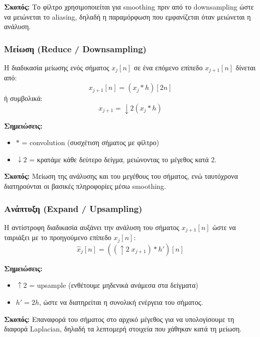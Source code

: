 \documentclass[12pt]{article}
\begin{document}
\textbf{Σκοπός:} Το φίλτρο χρησιμοποιείται για smoothing πριν από το downsampling ώστε να μειώνεται το aliasing, δηλαδή η παραμόρφωση που εμφανίζεται όταν μειώνεται η ανάλυση.

\subsubsection{Μείωση (Reduce / Downsampling)}

Η διαδικασία μείωσης ενός σήματος $x_j[n]$ σε ένα επόμενο επίπεδο $x_{j+1}[n]$ δίνεται από:
\begin{equation}
x_{j+1}[n] = (x_j * h)[2n]
\label{eq:reduce1}
\end{equation}
ή συμβολικά:
\begin{equation}
x_{j+1} = \downarrow 2 (x_j * h)
\label{eq:reduce2}
\end{equation}

\textbf{Σημειώσεις:}
\begin{itemize}
    \item $*$ = convolution (συσχέτιση σήματος με φίλτρο)
    \item $\downarrow 2$ = κρατάμε κάθε δεύτερο δείγμα, μειώνοντας το μέγεθος κατά 2.
\end{itemize}

\textbf{Σκοπός:} Μείωση της ανάλυσης και του μεγέθους του σήματος, ενώ ταυτόχρονα διατηρούνται οι βασικές πληροφορίες μέσω smoothing.

\subsubsection{Ανάπτυξη (Expand / Upsampling)}

Η αντίστροφη διαδικασία αυξάνει την ανάλυση του σήματος $x_{j+1}[n]$ ώστε να ταιριάξει με το προηγούμενο επίπεδο $x_j[n]$:
\begin{equation}
\hat{x}_j[n] = ((\uparrow 2 \; x_{j+1}) * h')[n]
\label{eq:expand}
\end{equation}

\textbf{Σημειώσεις:}
\begin{itemize}
    \item $\uparrow 2$ = upsample (ενθέτουμε μηδενικά ανάμεσα στα δείγματα)
    \item $h' = 2h$, ώστε να διατηρείται η συνολική ενέργεια του σήματος.
\end{itemize}

\textbf{Σκοπός:} Επαναφορά του σήματος στο αρχικό μέγεθος για να υπολογίσουμε τη διαφορά Laplacian, δηλαδή τα λεπτομερή στοιχεία που χάθηκαν κατά τη μείωση.
\end{document}
